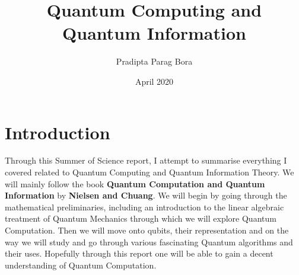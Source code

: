 \documentclass{article}
\title{Quantum Computing and Quantum Information }
\author{Pradipta Parag Bora}
\date{April 2020}
\begin{document}
\maketitle

\tableofcontents

\section{Introduction}
Through this Summer of Science report, I attempt to summarise everything I covered related to Quantum Computing and Quantum Information Theory. We will mainly follow the book \textbf{Quantum Computation and Quantum Information} by \textbf{Nielsen and Chuang}. We will begin by going through the mathematical preliminaries, including an introduction to the linear algebraic treatment of Quantum Mechanics through which we will explore Quantum Computation. Then we will move onto qubits, their representation and on the way we will study and go through various fascinating Quantum algorithms and their uses. Hopefully through this report one will be able to gain a decent understanding of Quantum Computation. 


\end{document}
